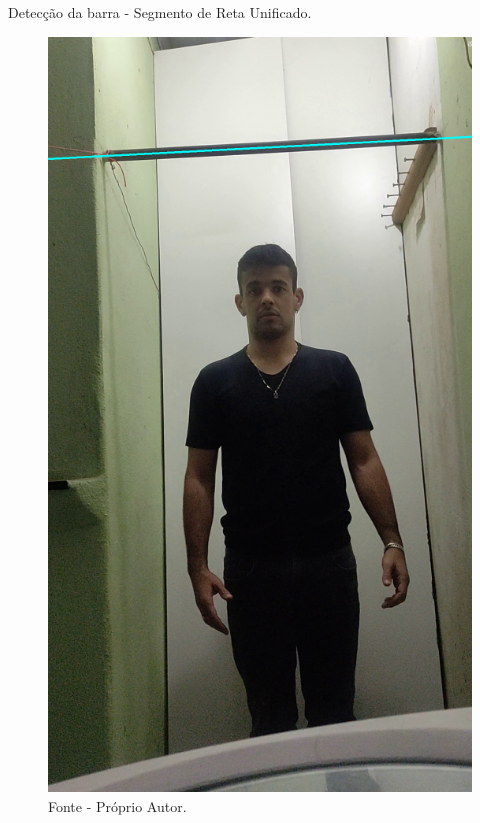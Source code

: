 \begin{frame}{Detecção da barra - Segmento de Reta Unificado.}
    \begin{figure}[!ht]
    \centering
    \includegraphics[scale=0.20]{img/desenvolvimento/detectaBarra/barra_unificada.png}
    \caption*{Fonte - Próprio Autor.}
    \end{figure}
\end{frame}

